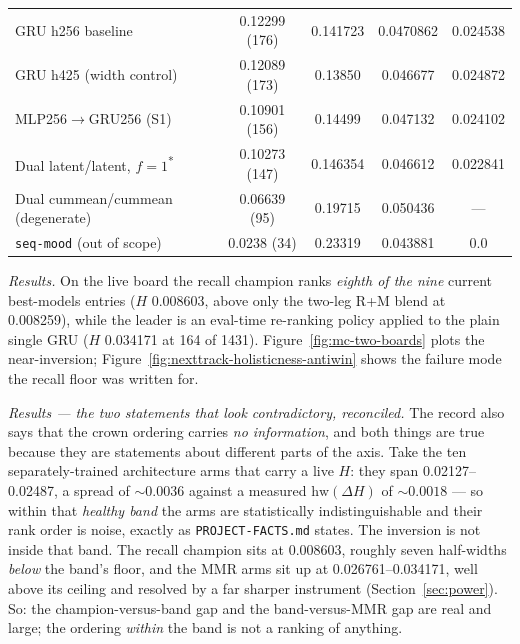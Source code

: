\documentclass[11pt]{article}
\begin{document}
\begin{table}[ht]
{\begin{tabular}{lcccc}
    \midrule
    GRU h256 baseline & 0.12299 (176) & 0.141723 & 0.0470862 & 0.024538 \\
    GRU h425 (width control) & 0.12089 (173) & 0.13850 & 0.046677 & 0.024872 \\
    MLP256$\to$GRU256 (S1) & 0.10901 (156) & 0.14499 & 0.047132 & 0.024102 \\
    Dual latent/latent, $f{=}1$\textsuperscript{*} & 0.10273 (147) & 0.146354 & 0.046612 & 0.022841 \\
    Dual cummean/cummean (degenerate) & 0.06639 (95) & 0.19715 & 0.050436 & --- \\
    \texttt{seq-mood} (out of scope) & 0.0238 (34) & 0.23319 & 0.043881 & 0.0 \\
    \bottomrule
  \end{tabular}}
\end{table}

\emph{Results.} On the live board the recall champion ranks \emph{eighth of the
nine} current best-models entries ($H$ \num{0.008603}, above only the two-leg
R+M blend at \num{0.008259}), while the leader is an eval-time re-ranking policy
applied to the plain single GRU ($H$ \num{0.034171} at \num{164} of \num{1431}).
Figure~\ref{fig:mc-two-boards} plots the near-inversion;
Figure~\ref{fig:nexttrack-holisticness-antiwin} shows the failure mode the
recall floor was written for.

\emph{Results --- the two statements that look contradictory, reconciled.} The
record also says that the crown ordering carries \emph{no information}, and both
things are true because they are statements about different parts of the axis.
Take the ten separately-trained architecture arms that carry a live $H$: they
span \numrange{0.02127}{0.02487}, a spread of ${\sim}\num{0.0036}$ against a
measured $\mathrm{hw}(\Delta H)$ of ${\sim}\num{0.0018}$ --- so within that
\emph{healthy band} the arms are statistically indistinguishable and their rank
order is noise, exactly as \texttt{PROJECT-FACTS.md} states. The inversion is not
inside that band. The recall champion sits at \num{0.008603}, roughly seven
half-widths \emph{below} the band's floor, and the MMR arms sit up at
\numrange{0.026761}{0.034171}, well above its ceiling and resolved by a far
sharper instrument (Section~\ref{sec:power}). So: the champion-versus-band gap
and the band-versus-MMR gap are real and large; the ordering \emph{within} the
band is not a ranking of anything.
\end{document}
